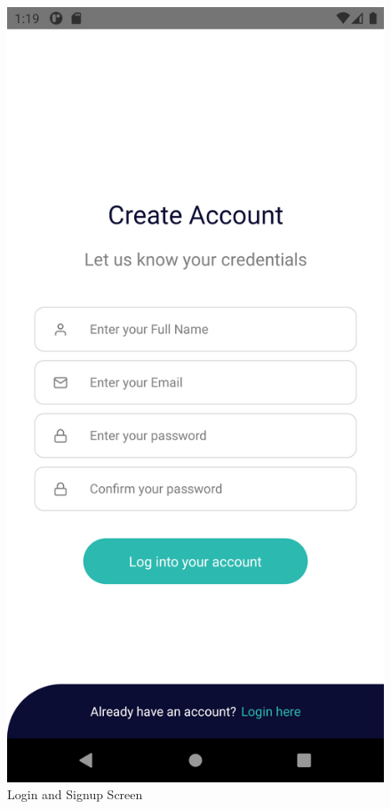 \documentclass{article}
\begin{document}
\begin{figure}
            \includegraphics[scale=0.1]{app_signup}
            \caption{Login and Signup Screen}
            \label{app:login}
        \end{figure}
\end{document}
